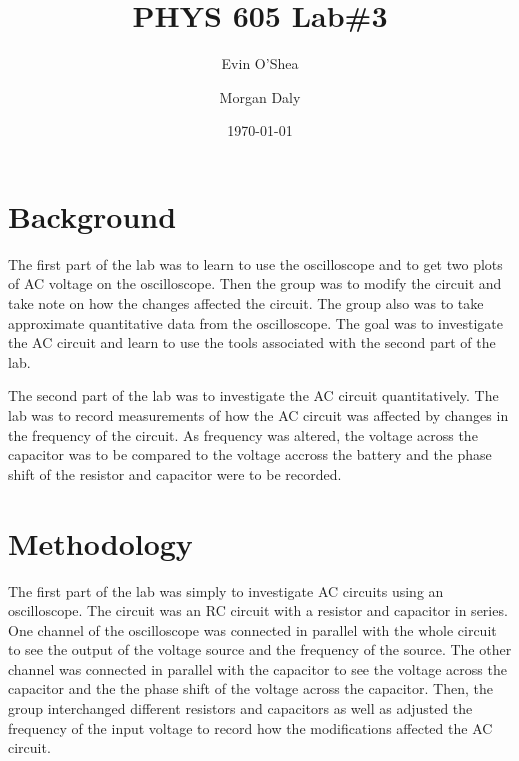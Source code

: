 \documentclass[twocolumn, amsmath]{revtex4}
\begin{document}
\title{PHYS 605 Lab\#3} 

\author{Evin O'Shea}  %
\author{Morgan Daly}
\date{\today}  


\begin{abstract}

	

\end{abstract}

\maketitle

%
%
\section{Background}
The first part of the lab was to learn to use the oscilloscope and to get two plots of AC voltage on the oscilloscope. Then the group was to modify the circuit and take note on how the changes affected the circuit. The group also was to take approximate quantitative data from the oscilloscope. The goal was to investigate the AC circuit and learn to use the tools associated with the second part of the lab.

The second part of the lab was to investigate the AC circuit quantitatively. The lab was to record measurements of how the AC circuit was affected by changes in the frequency of the circuit. As frequency was altered, the voltage across the capacitor was to be compared to the voltage accross the battery and the phase shift of the resistor and capacitor were to be recorded.


\section{Methodology}
The first part of the lab was simply to investigate AC circuits using an oscilloscope. The circuit was an RC circuit with a resistor and capacitor in series. One channel of the oscilloscope was connected in parallel with the whole circuit to see the output of the voltage source and the frequency of the source. The other channel was connected in parallel with the capacitor to see the voltage across the capacitor and the the phase shift of the voltage across the capacitor. Then, the group interchanged different resistors and capacitors as well as adjusted the frequency of the input voltage to record how the modifications affected the AC circuit.
\end{document}
